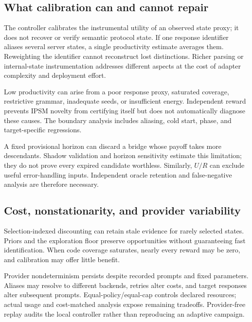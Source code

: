 \documentclass[final,5p,times,number]{elsarticle}
\begin{document}
\subsection{What calibration can and cannot repair}
The controller calibrates the instrumental utility of an observed state proxy; it does not recover or verify semantic protocol state. If one response identifier aliases several server states, a single productivity estimate averages them. Reweighting the identifier cannot reconstruct lost distinctions. Richer parsing or internal-state instrumentation addresses different aspects at the cost of adapter complexity and deployment effort.

Low productivity can arise from a poor response proxy, saturated coverage, restrictive grammar, inadequate seeds, or insufficient energy. Independent reward prevents IPSM novelty from certifying itself but does not automatically diagnose these causes. The boundary analysis includes aliasing, cold start, phase, and target-specific regressions.

A fixed provisional horizon can discard a bridge whose payoff takes more descendants. Shadow validation and horizon sensitivity estimate this limitation; they do not prove every expired candidate worthless. Similarly, $U/R$ can exclude useful error-handling inputs. Independent oracle retention and false-negative analysis are therefore necessary.

\subsection{Cost, nonstationarity, and provider variability}
Selection-indexed discounting can retain stale evidence for rarely selected states. Priors and the exploration floor preserve opportunities without guaranteeing fast identification. When code coverage saturates, nearly every reward may be zero, and calibration may offer little benefit.

Provider nondeterminism persists despite recorded prompts and fixed parameters. Aliases may resolve to different backends, retries alter costs, and target responses alter subsequent prompts. Equal-policy/equal-cap controls declared resources; actual usage and cost-matched analysis expose remaining tradeoffs. Provider-free replay audits the local controller rather than reproducing an adaptive campaign.
\end{document}
